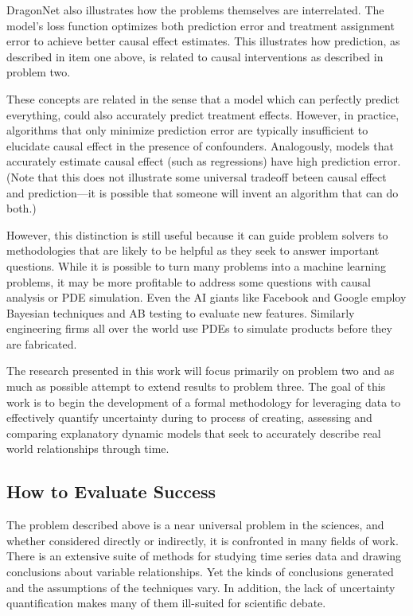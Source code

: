\documentclass{article}
\begin{document}
DragonNet also illustrates how the problems themselves are interrelated. The model's loss function optimizes both
prediction error and treatment assignment error to achieve better causal effect estimates. This illustrates
how prediction, as described in item one above, is related to causal interventions as described in problem two. 

These concepts are related in the sense that a model which can perfectly predict everything, could also accurately
predict treatment effects. However, in practice, algorithms that only minimize prediction error are typically insufficient to 
elucidate causal effect in the presence of confounders. Analogously, models that accurately estimate causal effect 
(such as regressions) have high prediction error. (Note that this does not illustrate some universal
tradeoff beteen causal effect and prediction—it is possible that someone will invent an algorithm that can do both.)

However, this distinction is still useful because it can guide problem solvers to methodologies that are likely to
be helpful as they seek to answer important questions. While it is possible to turn many problems into a machine
learning problems, it may be more profitable to address some questions with causal analysis or PDE simulation.
Even the AI giants like Facebook and Google employ Bayesian techniques and AB testing to evaluate new features.
Similarly engineering firms all over the world use PDEs to simulate products before they are fabricated.

The research presented in this work will focus primarily on problem two and as much as possible attempt to extend results
to problem three. The goal of this work is to begin the development of a formal methodology for leveraging data to effectively
quantify uncertainty during to process of creating, assessing and comparing explanatory dynamic models that seek to accurately
describe real world relationships through time.

    \subsection*{How to Evaluate Success}

        The problem described above is a near universal problem in the sciences, and whether considered directly or indirectly,
        it is confronted in many fields of work. There is an extensive suite of methods for studying time series data and
        drawing conclusions about variable relationships. Yet the kinds of conclusions generated and the assumptions of the
        techniques vary. In addition, the lack of uncertainty quantification makes many of them ill-suited for scientific debate.
\end{document}
